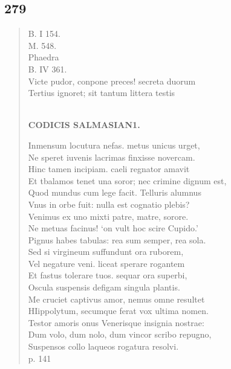 \documentclass[11pt, a4paper]{report}
\begin{document}
            \subsection*{279}
      \begin{verse}
      B. I 154. \\ M. 548. \\ Phaedra \\ B. IV 361. \\ Victe pudor, conpone preces! secreta duorum \\ Tertius ignoret; sit tantum littera testis \\ 
        ﻿\pagebreak 
    \begin{center} \textbf{CODICIS SALMASIAN1.} \end{center} \marginpar{[219]} Inmensum locutura nefas. metus unicus urget, \\ Ne speret iuvenis lacrimas finxisse novercam. \\ Hinc tamen incipiam. caeli regnator amavit \\ Et tbalamos tenet una soror; nec crimine dignum est, \\ Quod mundus cum lege facit. Telluris alumnus \\ Vnus in orbe fuit: nulla est cognatio plebis? \\ Venimus ex uno mixti patre, matre, sorore. \\ Ne metuas facinus! ‘on vult hoc scire Cupido.’ \\ Pignus habes tabulas: rea sum semper, rea sola. \\ Sed si virgineum suffundunt ora ruborem, \\ Vel negature veni. liceat sperare rogantem \\ Et fastus tolerare tuos. sequar ora superbi, \\ Oscula suspensis defigam singula plantis. \\ Me cruciet captivus amor, nemus omne resultet \\ HIippolytum, secumque ferat vox ultima nomen. \\ Testor amoris onus Venerisque insignia nostrae: \\ Dum volo, dum nolo, dum vincor scribo repugno, \\ Suspensos collo laqueos rogatura resolvi. \\ p. 141 \\ 
      \end{verse}
  
\end{document}
